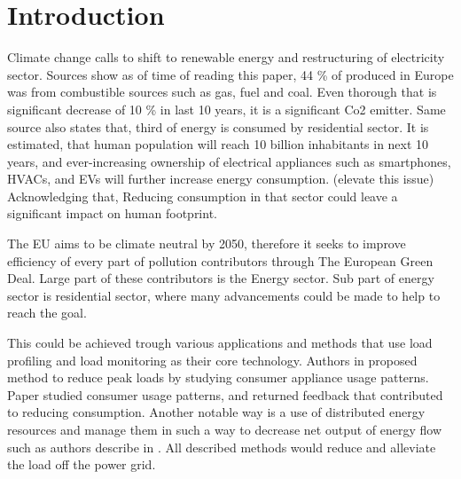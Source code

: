 \documentclass[
11pt, %
english, %
singlespacing, %
headsepline, %
]{MastersDoctoralThesis} %
\begin{document}
\mainmatter %

\pagestyle{thesis} %


% 

\chapter{Introduction}

Climate change calls to shift to renewable energy and restructuring of electricity sector.
Sources \cite{eurostat2020} show as of time of reading this paper, 44 \% of produced in Europe was from combustible sources such as gas, fuel and coal. Even 
thorough that is significant decrease of 10 \% in last 10 years, it is a significant Co2 emitter.
Same source \cite{eurostat2020} also states that, third of energy is consumed by residential sector. It is estimated, 
that human population will reach 10 billion inhabitants in next 10 years, and ever-increasing ownership of electrical appliances such as smartphones, HVACs, and EVs will further increase energy consumption. (elevate this issue)
Acknowledging that, Reducing consumption in that sector could leave a significant impact on human footprint. 


The EU aims to be climate neutral by 2050, therefore it seeks to improve efficiency of every part of pollution contributors through The European Green Deal.
Large part of these contributors is the Energy sector.
Sub part of energy sector is residential sector, where many advancements could be made to help to reach the goal.  

This could be achieved trough various applications and methods that use load profiling and load monitoring as their core technology.
Authors in \cite{Chuan2014} proposed method to reduce peak loads by studying consumer
appliance usage patterns. Paper \cite{Csoknyai2019} studied consumer usage patterns, and returned feedback that contributed to reducing consumption.
Another notable way is a use of distributed energy resources and manage them in such a way to decrease net output of energy flow such as authors describe in
\cite{MORENOJARAMILLO2021445}. All described methods would reduce and alleviate the load off the power grid.
\end{document}
